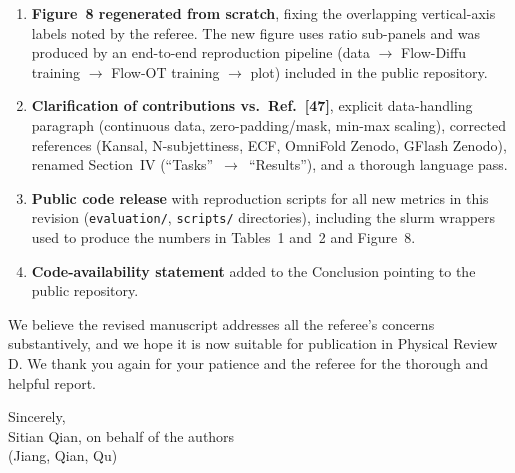 \documentclass[11pt]{article}
\begin{document}
\begin{enumerate}
  \item \textbf{Figure~8 regenerated from scratch}, fixing the
        overlapping vertical-axis labels noted by the referee.  The new
        figure uses ratio sub-panels and was produced by an end-to-end
        reproduction pipeline (data $\to$ Flow-Diffu training $\to$
        Flow-OT training $\to$ plot) included in the public repository.

  \item \textbf{Clarification of contributions vs.\ Ref.~[47]},
        explicit data-handling paragraph (continuous data,
        zero-padding/mask, min-max scaling), corrected references
        (Kansal, N-subjettiness, ECF, OmniFold Zenodo, GFlash Zenodo),
        renamed Section~IV (``Tasks''~$\to$~``Results''), and a
        thorough language pass.

  \item \textbf{Public code release} with reproduction scripts for all
        new metrics in this revision (\texttt{evaluation/},
        \texttt{scripts/} directories), including the slurm wrappers
        used to produce the numbers in Tables~1 and~2 and Figure~8.

  \item \textbf{Code-availability statement} added to the Conclusion
        pointing to the public repository.

\end{enumerate}

\bigskip
\noindent
We believe the revised manuscript addresses all the referee's concerns
substantively, and we hope it is now suitable for publication in Physical
Review D.  We thank you again for your patience and the referee for the
thorough and helpful report.

\bigskip
\noindent
Sincerely,\\[4pt]
Sitian Qian, on behalf of the authors\\
(Jiang, Qian, Qu)
\end{document}
